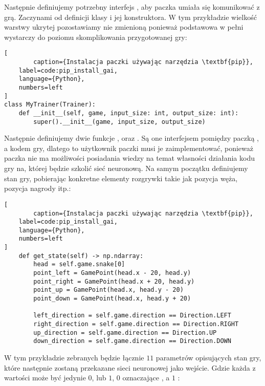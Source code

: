 Następnie definiujemy potrzebny interfejs , aby paczka  umiała się komunikować z grą. Zaczynami od definicji klasy i jej konstruktora. W tym przykładzie wielkość warstwy ukrytej pozostawiamy nie zmienioną ponieważ podstawowa w pełni wystarczy do poziomu skomplikowania przygotowanej gry:

\begin{onepage}
    \begin{lstlisting}[
        caption={Instalacja paczki używając narzędzia \textbf{pip}},
    label=code:pip_install_gai,
    language={Python},
    numbers=left
]
class MyTrainer(Trainer):
    def __init__(self, game, input_size: int, output_size: int):
        super().__init__(game, input_size, output_size)
    \end{lstlisting}
\end{onepage}

Następnie definiujemy dwie funkcje , oraz . Są one interfejsem pomiędzy paczką , a kodem gry, dlatego to użytkownik paczki musi je zaimplementować, ponieważ paczka nie ma możliwości posiadania wiedzy na temat własności działania kodu gry na, której będzie szkolić sieć neuronową. Na samym początku definiujemy stan gry, pobierając konkretne elementy rozgrywki takie jak pozycja węża, pozycja nagrody itp.:

\begin{onepage}
    \begin{lstlisting}[
        caption={Instalacja paczki używając narzędzia \textbf{pip}},
    label=code:pip_install_gai,
    language={Python},
    numbers=left
]
    def get_state(self) -> np.ndarray:
        head = self.game.snake[0]
        point_left = GamePoint(head.x - 20, head.y)
        point_right = GamePoint(head.x + 20, head.y)
        point_up = GamePoint(head.x, head.y - 20)
        point_down = GamePoint(head.x, head.y + 20)

        left_direction = self.game.direction == Direction.LEFT
        right_direction = self.game.direction == Direction.RIGHT
        up_direction = self.game.direction == Direction.UP
        down_direction = self.game.direction == Direction.DOWN
    \end{lstlisting}
\end{onepage}

W tym przykładzie zebranych będzie łącznie $11$ parametrów opisujących stan gry, które następnie zostaną przekazane sieci neuronowej jako wejście. Gdzie każda z wartości może być jedynie $0$, lub $1$, $0$ oznaczające , a $1$ :


